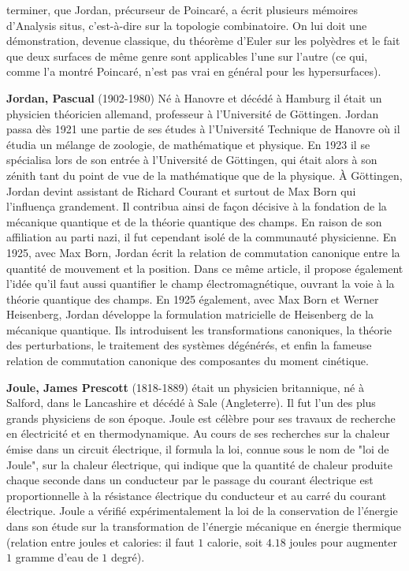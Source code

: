 terminer, que Jordan, précurseur de Poincaré, a écrit plusieurs mémoires d'Analysis situs, c'est-à-dire sur la topologie combinatoire. On lui doit une démonstration, devenue classique, du théorème d'Euler sur les polyèdres et le fait que deux surfaces de même genre sont applicables l'une sur l'autre (ce qui, comme l'a montré Poincaré, n'est pas vrai en général pour les hypersurfaces).

\textbf{Jordan, Pascual} (1902-1980) Né à Hanovre et décédé à Hamburg il était un physicien théoricien allemand, professeur à l'Université de Göttingen. Jordan passa dès 1921 une partie de ses études à l'Université Technique de Hanovre où il étudia un mélange de zoologie, de mathématique et physique. En 1923 il se spécialisa lors de son entrée à l'Université de Göttingen, qui était alors à son zénith tant du point de vue de la mathématique que de la physique. À Göttingen, Jordan devint assistant de Richard Courant et surtout de Max Born qui l'influença grandement. Il contribua ainsi de façon décisive à la fondation de la mécanique quantique et de la théorie quantique des champs. En raison de son affiliation au parti nazi, il fut cependant isolé de la communauté physicienne. En 1925, avec Max Born, Jordan écrit la relation de commutation canonique entre la quantité de mouvement et la position. Dans ce même article, il propose également l'idée qu'il faut aussi quantifier le champ électromagnétique, ouvrant la voie à la théorie quantique des champs. En 1925 également, avec Max Born et Werner Heisenberg, Jordan développe la formulation matricielle de Heisenberg de la mécanique quantique. Ils introduisent les transformations canoniques, la théorie des perturbations, le traitement des systèmes dégénérés, et enfin la fameuse relation de commutation canonique des composantes du moment cinétique.

\textbf{Joule, James Prescott} (1818-1889) était un physicien britannique, né à Salford, dans le Lancashire et décédé à Sale (Angleterre). Il fut l'un des plus grands physiciens de son époque. Joule est célèbre pour ses travaux de recherche en électricité et en thermodynamique. Au cours de ses recherches sur la chaleur émise dans un circuit électrique, il formula la loi, connue sous le nom de "loi de Joule", sur la chaleur électrique, qui indique que la quantité de chaleur produite chaque seconde dans un conducteur par le passage du courant électrique est proportionnelle à la résistance électrique du conducteur et au carré du courant électrique. Joule a vérifié expérimentalement la loi de la conservation de l'énergie dans son étude sur la transformation de l'énergie mécanique en énergie thermique (relation entre joules et calories: il faut $1$ calorie, soit $4.18$ joules pour augmenter $1$ gramme d'eau de $1$ degré).

